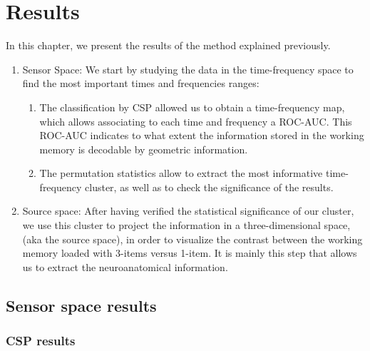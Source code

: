 \chapter{Results}

In this chapter, we present the results of the method explained previously.

\begin{enumerate}
    \item Sensor Space: We start by studying the data in the time-frequency space to find the most important times and frequencies ranges:
          \begin{enumerate}
              \item The classification by CSP allowed us to obtain a time-frequency map, which allows associating to each time and frequency a ROC-AUC. This ROC-AUC indicates to what extent the information stored in the working memory is decodable by geometric information.
              \item The permutation statistics allow to extract the most informative time-frequency cluster, as well as to check the significance of the results.
          \end{enumerate}

    \item Source space: After having verified the statistical significance of our cluster, we use this cluster to project the information in a three-dimensional space, (aka the source space), in order to visualize the contrast between the working memory loaded with 3-items versus 1-item. It is mainly this step that allows us to extract the neuroanatomical information.
\end{enumerate}

\section{Sensor space results}

\subsection{CSP results}


